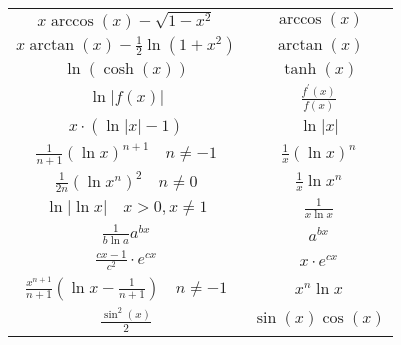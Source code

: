 \begin{tabular}{c||c}
 $x \arccos (x)-\sqrt{1-x^{2}}$ & $\arccos (x)$ \\
 $x \arctan (x)-\frac{1}{2} \ln \left(1+x^{2}\right)$ & $\arctan (x)$ \\
  $\ln (\cosh (x))$ & $\tanh (x)$ \\
  $\ln |f(x)|$ & $\frac{f^{\prime}(x)}{f(x)}$ \\
 $x \cdot(\ln |x|-1)$ & $\ln |x|$ \\
 $\frac{1}{n+1}(\ln x)^{n+1} \quad n \neq-1$ & $\frac{1}{x}(\ln x)^{n}$ \\
 $\frac{1}{2 n}\left(\ln x^{n}\right)^{2} \quad n \neq 0$ & $\frac{1}{x} \ln x^{n}$ \\
  $\ln |\ln x| \quad x>0, x \neq 1$ & $\frac{1}{x \ln x}$ \\
 $\frac{1}{b \ln a} a^{b x}$ & $a^{b x}$ \\
 $\frac{c x-1}{c^{2}} \cdot e^{c x}$ & $x \cdot e^{c x}$ \\
 $\frac{x^{n+1}}{n+1}\left(\ln x-\frac{1}{n+1}\right) \quad n \neq-1$ & $x^{n} \ln x$ \\
$\frac{\sin ^{2}(x)}{2}$ &
$\sin (x) \cos (x)$ \\
\hline
\end{tabular}
